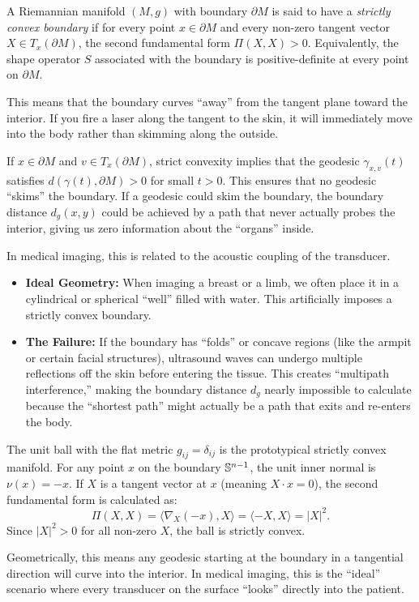 \begin{definition}
  A Riemannian manifold $(M, g)$ with boundary $\partial M$ is said to have a \emph{strictly convex boundary} if for every point $x \in \partial M$ and every non-zero tangent vector $X \in T_x(\partial M)$, the second fundamental form $\Pi(X, X) > 0$. Equivalently, the shape operator $S$ associated with the boundary is positive-definite at every point on $\partial M$.
\end{definition}

This means that the boundary curves ``away'' from the tangent plane toward the interior. If you fire a laser along the tangent to the skin, it will immediately move into the body rather than skimming along the outside.

If $x \in \partial M$ and $v \in T_x(\partial M)$, strict convexity implies that the geodesic $\gamma_{x,v}(t)$ satisfies $d(\gamma(t), \partial M) > 0$ for small $t > 0$. This ensures that no geodesic ``skims'' the boundary. If a geodesic could skim the boundary, the boundary distance $d_g(x, y)$ could be achieved by a path that never actually probes the interior, giving us zero information about the ``organs'' inside.

In medical imaging, this is related to the acoustic coupling of the transducer.
\begin{itemize}
  \item \textbf{Ideal Geometry:} When imaging a breast or a limb, we often place it in a cylindrical or spherical ``well'' filled with water. This artificially imposes a strictly convex boundary.
  \item \textbf{The Failure:} If the boundary has ``folds'' or concave regions (like the armpit or certain facial structures), ultrasound waves can undergo multiple reflections off the skin before entering the tissue. This creates ``multipath interference,'' making the boundary distance $d_g$ nearly impossible to calculate because the ``shortest path'' might actually be a path that exits and re-enters the body.
\end{itemize}

\begin{example}
  The unit ball with the flat metric $g_{ij} = \delta_{ij}$ is the prototypical strictly convex manifold. For any point $x$ on the boundary $\S^{n-1}$, the unit inner normal is $\nu(x) = -x$. If $X$ is a tangent vector at $x$ (meaning $X \cdot x = 0$), the second fundamental form is calculated as:
  \[%
    \Pi(X, X) = \langle \nabla_X (-x), X \rangle = \langle -X, X \rangle = |X|^2
  .\]%
  Since $|X|^2 > 0$ for all non-zero $X$, the ball is strictly convex.

  Geometrically, this means any geodesic starting at the boundary in a tangential direction will curve into the interior. In medical imaging, this is the ``ideal'' scenario where every transducer on the surface ``looks'' directly into the patient.
\end{example}

